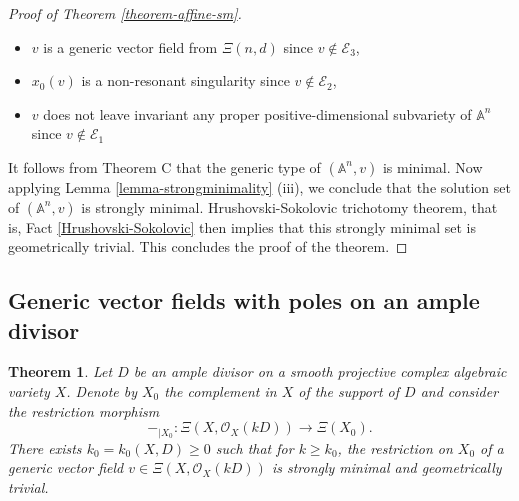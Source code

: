 \documentclass[12pt]{amsart}
\theoremstyle{definition}
\theoremstyle{plain}
\newtheorem{theorem}[definition]{Theorem}
\theoremstyle{exampstyle}
\theoremstyle{exampstyle}\newtheorem{thmxbis}{Theorem}
\numberwithin{equation}{section}
\theoremstyle{remark}
\begin{document}
\begin{proof}[Proof of Theorem \ref{theorem-affine-sm}]
\begin{itemize}
\item $v$ is a generic vector field from $\Xi(n,d)$ since $v \notin \mathcal E_3$, 
\item $x_0(v)$ is a non-resonant singularity since $v \notin \mathcal E_2$,
\item $v$ does not leave invariant any proper positive-dimensional subvariety of $\mathbb{A}^n$  since $v \notin \mathcal E_1$
\end{itemize}
It follows from Theorem C that the generic type of  $(\mathbb{A}^n,v)$  is minimal. Now applying Lemma \ref{lemma-strongminimality} (iii), we conclude that the solution set of  $(\mathbb{A}^n,v)$ is strongly minimal. Hrushovski-Sokolovic trichotomy theorem, that is, Fact \ref{Hrushovski-Sokolovic} then implies that this strongly minimal set is geometrically trivial. This concludes the proof of the theorem.  
\end{proof} 


\subsection{Generic vector fields with poles on an ample divisor}


\begin{theorem} \label{theorem-sm-ample}
Let $D$ be an ample divisor on a smooth projective complex algebraic variety $X$. Denote by $X_0$ the complement in $X$ of the support of $D$  and consider the restriction morphism 
$$ -_{\mid X_0}: \Xi(X,\mathcal O_X(kD)) \rightarrow \Xi(X_0).$$
There exists $k_0 = k_0(X,D) \geq 0$ such that for $k \geq k_0$, the restriction on $X_0$ of a {\em generic} vector field $v \in \Xi(X,\mathcal O_X(kD))$ is strongly minimal and geometrically trivial. 
\end{theorem} 
\end{document}

